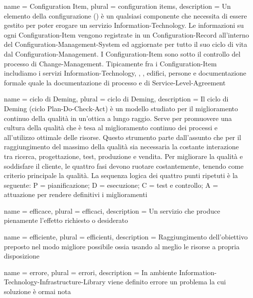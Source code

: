 %
%
{
	name		= {Configuration Item},
	plural		= {configuration items},
	description = {Un elemento della configurazione () è un qualsiasi componente che necessita di essere gestito per poter erogare un servizio \acs{Information-Technology}. Le informazioni su ogni \acs{Configuration-Item} vengono registrate in un \acf{Configuration-Record} all'interno del \acf{Configuration-Management-System} ed aggiornate per tutto il suo ciclo di vita dal \acf{Configuration-Management}. I \ac{Configuration-Item} sono sotto il controllo del processo di \acs{Change-Management}. Tipicamente fra i \ac{Configuration-Item} includiamo i servizi \acs{Information-Technology}, , , edifici, persone e documentazione formale quale la documentazione di processo e di \acf{Service-Level-Agreement}}
}

{
	name		= {ciclo di Deming},
	plural		= {ciclo di Deming},
	description = {Il ciclo di Deming (ciclo \acf{Plan-Do-Check-Act}) è un modello studiato per il miglioramento continuo della qualità in un'ottica a lungo raggio. Serve per promuovere una cultura della qualità che è tesa al miglioramento continuo dei processi e all'utilizzo ottimale delle risorse. Questo strumento parte dall'assunto che per il raggiungimento del massimo della qualità sia necessaria la costante interazione tra ricerca, progettazione, test, produzione e vendita. Per migliorare la qualità e soddisfare il cliente, le quattro fasi devono ruotare costantemente, tenendo come criterio principale la qualità. La sequenza logica dei quattro punti ripetuti è la seguente: P = pianificazione; D = esecuzione; C = test e controllo; A = attuazione per rendere definitivi i miglioramenti}
}

{
	name		= {efficace},
	plural		= {efficaci},
	description = {Un servizio che produce pienamente l'effetto richiesto o desiderato}
}

{
	name		= {efficiente},
	plural		= {efficienti},
	description = {Raggiungimento dell'obiettivo preposto nel modo migliore possibile ossia usando al meglio le risorse a propria disposizione}
}

{
	name		= {errore},
	plural		= {errori},
	description = {In ambiente \ac{Information-Technology-Infrastructure-Library} viene definito errore un problema la cui soluzione è ormai nota}
}

